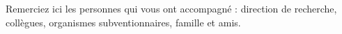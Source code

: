 Remerciez ici les personnes qui vous ont accompagné : direction de recherche,
collègues, organismes subventionnaires, famille et amis.
